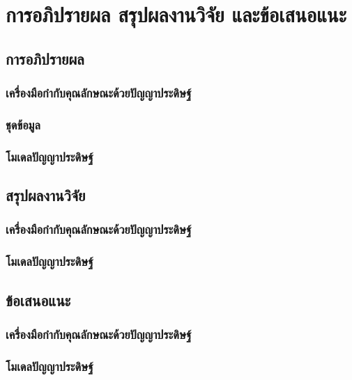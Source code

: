 
\chapter{การอภิปรายผล สรุปผลงานวิจัย และข้อเสนอแนะ}

\section{การอภิปรายผล}
\subsection{เครื่องมือกำกับคุณลักษณะด้วยปัญญาประดิษฐ์}


\subsection{ชุดข้อมูล}

\subsection{โมเดลปัญญาประดิษฐ์}


\section{สรุปผลงานวิจัย}
\subsection{เครื่องมือกำกับคุณลักษณะด้วยปัญญาประดิษฐ์}


\subsection{โมเดลปัญญาประดิษฐ์}


\section{ข้อเสนอแนะ}
\subsection{เครื่องมือกำกับคุณลักษณะด้วยปัญญาประดิษฐ์}


\subsection{โมเดลปัญญาประดิษฐ์}

